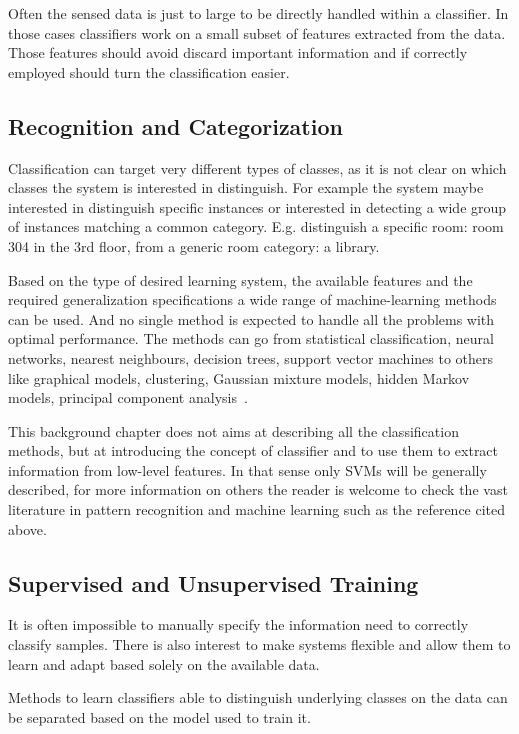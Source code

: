 Often the sensed data is just to large to be directly handled within a classifier. In those
cases classifiers work on a small subset of features extracted from the data. Those features
should avoid discard important information and if correctly employed should turn the classification
easier.

\subsection{Recognition and Categorization}
Classification can target very different types of classes, as it is not clear on which classes
the system is interested in distinguish. For example the system maybe interested in distinguish
specific instances or interested in detecting a wide group of instances matching a
common category. E.g. distinguish a specific room: room 304 in the 3rd floor, from a generic room
category: a library.

Based on the type of desired learning system, the available features and the required generalization
specifications a wide range of machine-learning methods can be used. And no single method
is expected to handle all the problems with optimal performance.
The methods can go from statistical classification, neural networks, nearest neighbours,
decision trees, support vector machines to others like graphical models, clustering,
Gaussian mixture models, hidden Markov models, principal component analysis~\cite{bishop2006pattern}.

This background chapter does not aims at describing all the classification methods, but at
introducing the concept of classifier and to use them to extract information from low\hyp{}level
features. In that sense only \glspl{SVM} will be generally described, for more information
on others the reader is welcome to check the vast literature in pattern recognition and machine
learning such as the reference cited above.

\subsection{Supervised and Unsupervised Training}
It is often impossible to manually specify the information need to correctly classify samples.
There is also interest to make systems flexible and allow them to learn and adapt based solely
on the available data.

Methods to learn classifiers able to distinguish underlying classes on the data can be
separated based on the model used to train it.

